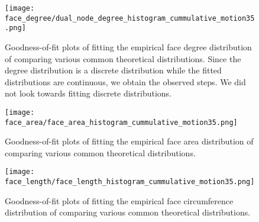\begin{figure}[!htbp]
\begin{center}%
  \texttt{[image: face\_degree/dual\_node\_degree\_histogram\_cummulative\_motion35.png]}
\end{center}%
\caption[Goodness-of-fit plots: face degrees]{Goodness-of-fit plots of fitting the empirical face degree distribution of  comparing various common theoretical distributions. Since the degree distribution is a discrete distribution while the fitted distributions are continuous, we obtain the observed steps. We did not look towards fitting discrete distributions.}
\label{fig:sup::face_degree_goodness}
\end{figure}

\begin{figure}[!htbp]
\begin{center}%
  \texttt{[image: face\_area/face\_area\_histogram\_cummulative\_motion35.png]}
\end{center}%
\caption[Goodness-of-fit plots: face area]{Goodness-of-fit plots of fitting the empirical face area distribution of  comparing various common theoretical distributions.}
\label{fig:sup::face_area_goodness}
\end{figure}

\begin{figure}[!htbp]
\begin{center}%
  \texttt{[image: face\_length/face\_length\_histogram\_cummulative\_motion35.png]}
\end{center}%
\caption[Goodness-of-fit plots: face circumference]{Goodness-of-fit plots of fitting the empirical face circumference distribution of  comparing various common theoretical distributions.}
\label{fig:sup::face_length_goodness}
\end{figure}

